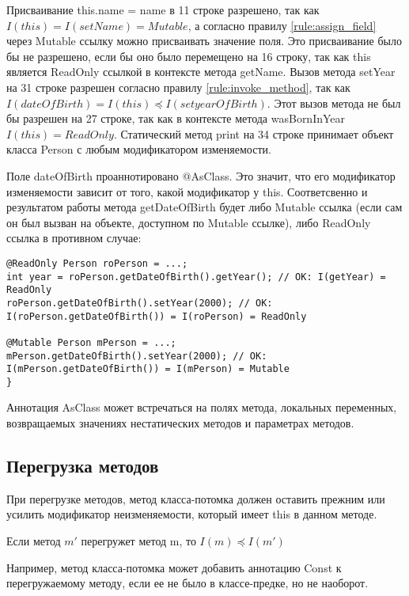 Присваивание this.name = name в 11 строке разрешено, так как $I(this) = I(setName) = Mutable$, а согласно правилу \ref{rule:assign_field} через Mutable ссылку можно присваивать значение поля. Это присваивание было бы не разрешено, если бы оно было перемещено  на 16 строку, так как this является ReadOnly ссылкой в контексте метода getName. Вызов метода setYear на 31 строке разрешен согласно правилу \ref{rule:invoke_method}, так как $I(dateOfBirth) = I(this) \preceq I(setyearOfBirth)$. Этот вызов метода не был бы разрешен на 27 строке, так как в контексте метода wasBornInYear $I(this) = ReadOnly$. Статический метод print на 34 строке принимает объект класса Person с любым модификатором изменяемости. 

Поле dateOfBirth проаннотировано @AsClass. Это значит, что его модификатор изменяемости зависит от того, какой модификатор у this. Соответсвенно и результатом работы метода getDateOfBirth будет либо Mutable ссылка (если сам он был вызван на объекте, доступном по Mutable ссылке), либо ReadOnly ссылка в противном случае:

\begin{lstlisting}[caption=Использование аннотации AsClass, label=code:as_class]
@ReadOnly Person roPerson = ...;
int year = roPerson.getDateOfBirth().getYear(); // OK: I(getYear) = ReadOnly
roPerson.getDateOfBirth().setYear(2000); // OK: I(roPerson.getDateOfBirth()) = I(roPerson) = ReadOnly
	
@Mutable Person mPerson = ...;
mPerson.getDateOfBirth().setYear(2000); // OK: I(mPerson.getDateOfBirth()) = I(mPerson) = Mutable
}
\end{lstlisting} 

Аннотация AsClass может встречаться на полях метода, локальных переменных, возвращаемых значениях нестатических методов и параметрах методов.

\subsection{Перегрузка методов}

При перегрузке методов, метод класса-потомка должен оставить прежним или усилить модификатор неизменяемости, который имеет this в данном методе. 

\begin{Rule}\label{rule:override_method}
Если метод $m'$ перегружет метод m, то $I(m) \preceq I(m')$
\end{Rule}

Например, метод класса-потомка может добавить аннотацию Const к перегружаемому методу, если ее не было в классе-предке, но не наоборот. 

